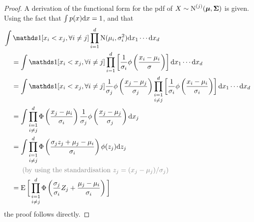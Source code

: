 \begin{proof}
  A derivation of the functional form for the pdf of $X \sim \operatorname{N}^{(j)}({\bm\mu}, {\bm\Sigma})$ is given. Using the fact that $\int p(x) \text{d} x = 1$, and that
  \begin{align*}
    \int &\ind[x_i < x_j, \forall i \neq j] \prod_{i=1}^d \N(\mu_i, \sigma_i^2) \d x_1 \cdots \d x_d \\*
    &=  \int \ind[x_i < x_j, \forall i \neq j] \prod_{i=1}^d \left[ \frac{1}{\sigma_i} \phi \left( \frac{x_i-\mu_i}{\sigma} \right) \right] \d x_1 \cdots \d x_d \\
    &=  \int \ind[x_i < x_j, \forall i \neq j] \frac{1}{\sigma_j} \phi \left( \frac{x_j-\mu_j}{\sigma_j} \right)\mathop{\prod_{i=1}^d}_{i \neq j} \left[ \frac{1}{\sigma_i} \phi \left( \frac{x_i-\mu_i}{\sigma_i} \right) \right] \d x_1 \cdots \d x_d \\    
    &= \int \mathop{\prod_{i=1}^d}_{i \neq j} \Phi \left(\frac{x_j - \mu_i}{\sigma_i} \right) \frac{1}{\sigma_j} \phi \left( \frac{x_j-\mu_j}{\sigma_j} \right) \d x_j \\
    &= \int \mathop{\prod_{i=1}^d}_{i \neq j} \Phi \left(\frac{\sigma_j z_j + \mu_j - \mu_i}{\sigma_i} \right) \phi(z_j) \d z_j \\
    &\phantom{==} {\color{gray} (\text{by using the standardisation } z_j = (x_j - \mu_j) / \sigma_j)} \\    
    &= \E \bigg[ \mathop{\prod_{i=1}^d}_{i \neq j} \Phi \left(\frac{\sigma_j}{\sigma_i}Z_j + \frac{\mu_j - \mu_i}{\sigma_i} \right) \bigg] \\
  \end{align*}
  the proof follows directly.
\end{proof}

